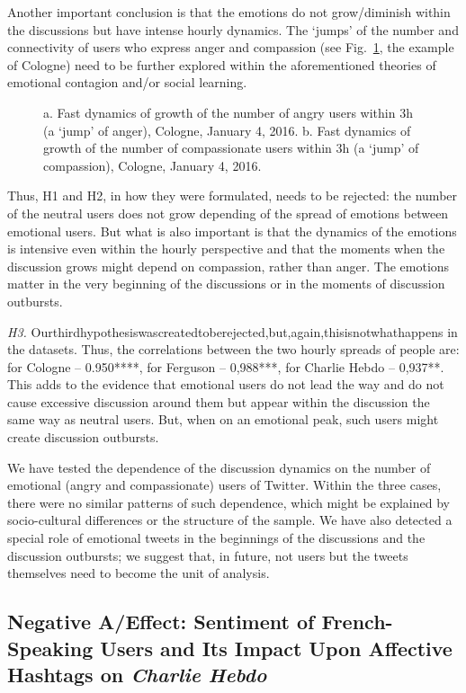 Another important conclusion is that the emotions do not grow/diminish within the discussions but have intense hourly dynamics. The ‘jumps’ of the number and connectivity of users who express anger and compassion (see Fig.~\cref{fig:fastDynamcs}, the example of Cologne) need to be further explored within the aforementioned theories of emotional contagion and/or social learning.

\begin{figure}[ht]
	\caption{a. Fast dynamics of growth of the number of angry users within 3h (a ‘jump’ of anger), Cologne, January 4, 2016. b. Fast dynamics of growth of the number of compassionate users within 3h (a ‘jump’ of compassion), Cologne, January 4, 2016.}\label{fig:fastDynamcs}
\end{figure} 

Thus, H1 and H2, in how they were formulated, needs to be rejected: the number of the neutral users does not grow depending of the spread of emotions between emotional users. But what is also important is that the dynamics of the emotions is intensive even within the hourly perspective and that the moments when the discussion grows might depend on compassion, rather than anger. The emotions matter in the very beginning of the discussions or in the moments of discussion outbursts.

\textit{H3.} Ourthirdhypothesiswascreatedtoberejected,but,again,thisisnotwhathappens in the datasets. Thus, the correlations between the two hourly spreads of people are: for Cologne -- 0.950****, for Ferguson -- 0,988***, for Charlie Hebdo -- 0,937**. This adds to the evidence that emotional users do not lead the way and do not cause excessive discussion around them but appear within the discussion the same way as neutral users. But, when on an emotional peak, such users might create discussion outbursts.

We have tested the dependence of the discussion dynamics on the number of emotional (angry and compassionate) users of Twitter. Within the three cases, there were no similar patterns of such dependence, which might be explained by socio-cultural differences or the structure of the sample. We have also detected a special role of emotional tweets in the beginnings of the discussions and the discussion outbursts; we suggest that, in future, not users but the tweets themselves need to become the unit of analysis.

\subsection{Negative A/Effect: Sentiment of French- Speaking Users and Its Impact Upon Affective Hashtags on \textit{Charlie Hebdo}}\label{subsec:ch5/sec3/sub3}

